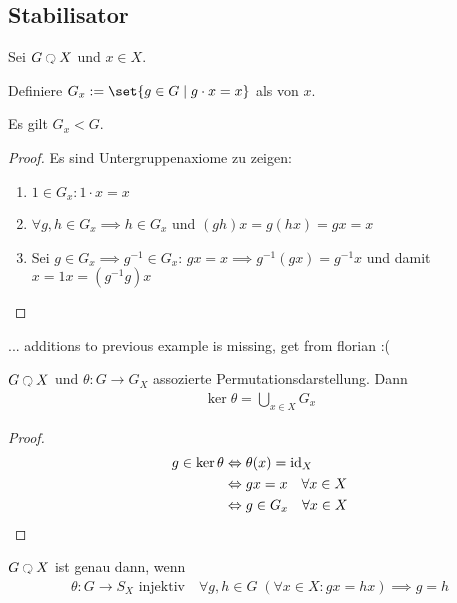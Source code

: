 \subsection*{Stabilisator}
Sei $G \Circlearrowleft X$ und $x \in X$.
\begin{definition}
	Definiere $G_x := \set{g \in G \mid g \cdot x = x}$ als  von $x$.
\end{definition}
\begin{lemma}
	Es gilt $G_x < G$.
\end{lemma}
\begin{proof}
	Es sind Untergruppenaxiome zu zeigen:
	\begin{enumerate}
		\item $1 \in G_x\colon 1 \cdot x = x$
		\item $\forall g,h \in G_x \implies h \in G_x$ und $(gh)x = g(hx) = gx = x$
		\item Sei $g \in G_x \implies g^{-1} \in G_x$: $gx = x \implies g^{-1}(gx) = g^{-1}x$ und damit $x = 1 x = (g^{-1}g)x$
	\end{enumerate}
\end{proof}
... additions to previous example is missing, get from florian :(
\begin{lemma}
	$G \Circlearrowleft X$ und $\theta\colon G \to G_X$ assozierte Permutationsdarstellung. Dann
	\begin{align*}
	\ker \theta = \bigcup_{x \in X}G_x
	\end{align*}
\end{lemma}
\begin{proof}
	\begin{align*}
		g \in \ker \theta &\Leftrightarrow \theta(x) = \operatorname{id}_X\\
		&\Leftrightarrow g x = x \quad \forall x \in X\\
		&\Leftrightarrow g \in G_x \quad \forall x \in X
	\end{align*}
\end{proof}
\begin{definition}
	$G \Circlearrowleft X$ ist  genau dann, wenn
	\begin{align*}
	\theta\colon G \to S_X \text{ injektiv}\quad \forall g,h \in G \; (\forall x \in X \colon gx = hx) \implies g = h
	\end{align*}
\end{definition}
